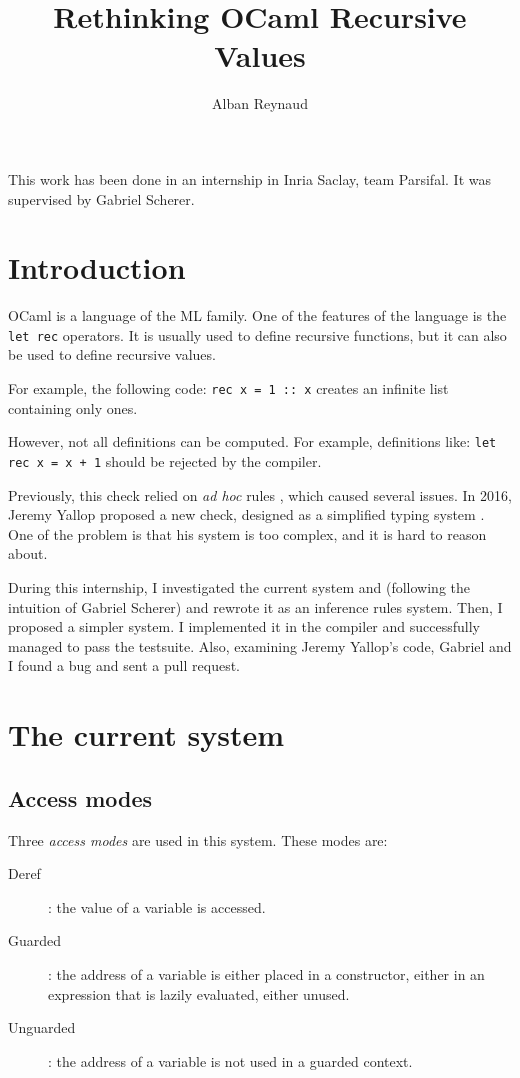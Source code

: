\documentclass{article}
\title{Rethinking OCaml Recursive Values}
\author{Alban Reynaud}
\date{}
\begin{document}
\maketitle

This work has been done in an internship in Inria Saclay, team Parsifal. It was
supervised by Gabriel Scherer.

\section{Introduction}
OCaml is a language of the ML family. One of the features of the language is the
\lstinline|let rec| operators. It is usually used to define recursive
functions, but it can also be used to define recursive values.

For example, the following code: \lstinline|rec x = 1 :: x| creates an infinite
list containing only ones.

However, not all definitions can be computed. For example, definitions like:
\lstinline|let rec x = x + 1| should be rejected by the compiler.

Previously, this check relied on \textit{ad hoc} rules \cite{PreviousRules},
which caused several issues. In 2016, Jeremy Yallop proposed a new check,
designed as a simplified typing system \cite{Yallop}. One of the problem is that
his system is too complex, and it is hard to reason about.

During this internship, I investigated the current system and (following the
intuition of Gabriel Scherer) and rewrote it as an inference rules system. Then,
I proposed a simpler system. I implemented it in the compiler and successfully
managed to pass the testsuite. Also, examining Jeremy Yallop's code, Gabriel and
I found a bug and sent a pull request.

\section{The current system}

\subsection{Access modes}
Three \textit{access modes} are used in this system. These modes are:
\begin{description}
  \item[Deref] : the value of a variable is accessed.
  \item[Guarded] : the address of a variable is either placed in a constructor,
    either in an expression that is lazily evaluated, either unused.
  \item[Unguarded] : the address of a variable is not used in a guarded
    context.
\end{description}
\end{document}
